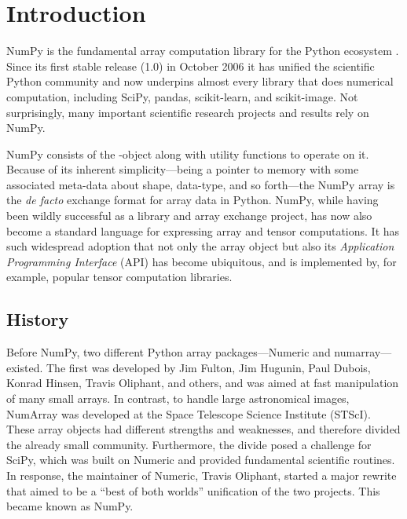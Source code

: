 \section*{Introduction}

NumPy is the fundamental array computation library for the Python
ecosystem \cite{dubois2007guest,oliphant2007python,millman2011python,perez2011python}.
Since its first stable release (1.0) in October 2006 it has unified
the scientific Python community and now underpins almost every library
that does numerical computation, including SciPy\cite{virtanen2019scipy},
pandas\cite{mckinney-proc-scipy-2010}, scikit-learn\cite{pedregosa2011scikit},
and scikit-image\cite{vanderwalt2014scikit}.
Not surprisingly, many important scientific research projects and
results rely on NumPy.

NumPy consists of the -object along with utility functions to
operate on it.
Because of its inherent simplicity—being a pointer to memory with some
associated meta-data about shape, data-type, and so forth—the NumPy array is
the {\it de facto} exchange format for array data in Python.
NumPy, while having been wildly successful as a library and array exchange
project, has now also become a standard language for expressing array and
tensor computations.  
It has such widespread adoption that not only the array object but also its
{\it Application Programming Interface} (API) has become ubiquitous, and is
implemented by, for example, popular tensor computation libraries.


\subsection*{History}

Before NumPy, two different Python array packages—Numeric and
numarray—existed.  The first was developed by Jim Fulton, Jim Hugunin, Paul Dubois, Konrad
Hinsen, Travis Oliphant, and others, and was aimed at fast manipulation of many
small arrays.  In contrast, to handle large astronomical images,
NumArray was developed at the Space Telescope Science Institute (STScI).
These array objects had different strengths and weaknesses, and therefore
divided the already small community.  Furthermore, the divide
posed a challenge for SciPy, which was built on Numeric and provided
fundamental scientific routines.
In response, the maintainer of Numeric, Travis Oliphant, started a
major rewrite that aimed to be a ``best of both worlds'' unification
of the two projects.  This became known as NumPy.

